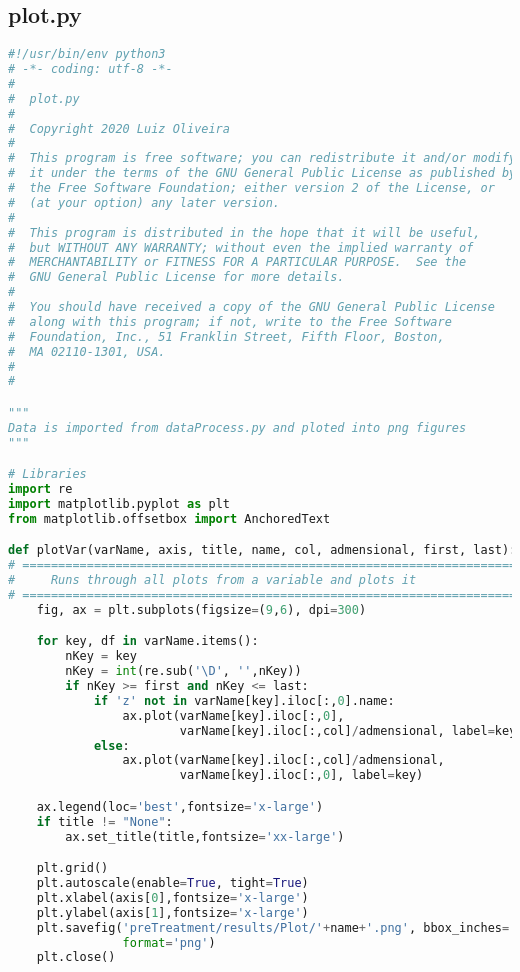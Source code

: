 \subsection{plot.py}
\begin{lstlisting}[language=python]
#!/usr/bin/env python3
# -*- coding: utf-8 -*-
#
#  plot.py
#  
#  Copyright 2020 Luiz Oliveira
#  
#  This program is free software; you can redistribute it and/or modify
#  it under the terms of the GNU General Public License as published by
#  the Free Software Foundation; either version 2 of the License, or
#  (at your option) any later version.
#  
#  This program is distributed in the hope that it will be useful,
#  but WITHOUT ANY WARRANTY; without even the implied warranty of
#  MERCHANTABILITY or FITNESS FOR A PARTICULAR PURPOSE.  See the
#  GNU General Public License for more details.
#  
#  You should have received a copy of the GNU General Public License
#  along with this program; if not, write to the Free Software
#  Foundation, Inc., 51 Franklin Street, Fifth Floor, Boston,
#  MA 02110-1301, USA.
#  
#  

"""
Data is imported from dataProcess.py and ploted into png figures
"""

# Libraries
import re
import matplotlib.pyplot as plt
from matplotlib.offsetbox import AnchoredText

def plotVar(varName, axis, title, name, col, admensional, first, last):
# =============================================================================
#     Runs through all plots from a variable and plots it
# =============================================================================
    fig, ax = plt.subplots(figsize=(9,6), dpi=300)

    for key, df in varName.items():
        nKey = key
        nKey = int(re.sub('\D', '',nKey))
        if nKey >= first and nKey <= last:
            if 'z' not in varName[key].iloc[:,0].name:
                ax.plot(varName[key].iloc[:,0],
                        varName[key].iloc[:,col]/admensional, label=key)
            else:
                ax.plot(varName[key].iloc[:,col]/admensional,
                        varName[key].iloc[:,0], label=key)

    ax.legend(loc='best',fontsize='x-large')
    if title != "None":
        ax.set_title(title,fontsize='xx-large')

    plt.grid()
    plt.autoscale(enable=True, tight=True)
    plt.xlabel(axis[0],fontsize='x-large')
    plt.ylabel(axis[1],fontsize='x-large')
    plt.savefig('preTreatment/results/Plot/'+name+'.png', bbox_inches='tight',
                format='png')
    plt.close()


\end{lstlisting}
